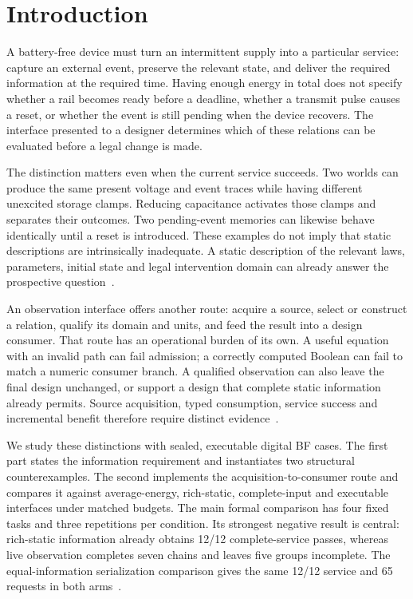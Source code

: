 \section{Introduction}
A battery-free device must turn an intermittent supply into a particular
service: capture an external event, preserve the relevant state, and deliver
the required information at the required time. Having enough energy in total
does not specify whether a rail becomes ready before a deadline, whether a
transmit pulse causes a reset, or whether the event is still pending when the
device recovers. The interface presented to a designer determines which of
these relations can be evaluated before a legal change is made.

The distinction matters even when the current service succeeds. Two worlds
can produce the same present voltage and event traces while having different
unexcited storage clamps. Reducing capacitance activates those clamps and
separates their outcomes. Two pending-event memories can likewise behave
identically until a reset is introduced. These examples do not imply that
static descriptions are intrinsically inadequate. A static description of the
relevant laws, parameters, initial state and legal intervention domain can
already answer the prospective question~\cite{structural,mechanisms}.

An observation interface offers another route: acquire a source, select or
construct a relation, qualify its domain and units, and feed the result into
a design consumer. That route has an operational burden of its own. A useful
equation with an invalid path can fail admission; a correctly computed Boolean
can fail to match a numeric consumer branch. A qualified observation can also
leave the final design unchanged, or support a design that complete static
information already permits. Source acquisition, typed consumption, service
success and incremental benefit therefore require distinct evidence~\cite{contract,original,tables}.

We study these distinctions with sealed, executable digital BF cases. The
first part states the information requirement and instantiates two structural
counterexamples. The second implements the acquisition-to-consumer route and
compares it against average-energy, rich-static, complete-input and executable
interfaces under matched budgets. The main formal comparison has four fixed
tasks and three repetitions per condition. Its strongest negative result is
central: rich-static information already obtains 12/12 complete-service passes,
whereas live observation completes seven chains and leaves five groups
incomplete. The equal-information serialization comparison gives the same
12/12 service and 65 requests in both arms~\cite{comparison,tables}.

